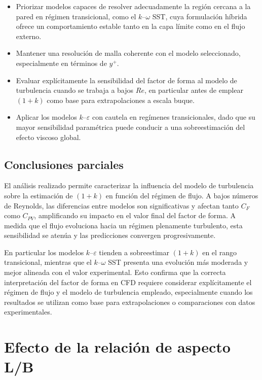 \begin{itemize}
    \item Priorizar modelos capaces de resolver adecuadamente la región cercana a la pared en régimen transicional, como el $k$--$\omega$ SST, 
    cuya formulación híbrida ofrece un comportamiento estable tanto en la capa límite como en el flujo externo.
    \item Mantener una resolución de malla coherente con el modelo seleccionado, especialmente en términos de $y^+$.
    \item Evaluar explícitamente la sensibilidad del factor de forma al modelo de turbulencia cuando se trabaja a bajos $Re$, en particular 
    antes de emplear $(1+k)$ como base para extrapolaciones a escala buque.
    \item Aplicar los modelos $k$--$\varepsilon$ con cautela en regímenes transicionales, dado que su mayor sensibilidad paramétrica puede 
    conducir a una sobreestimación del efecto viscoso global.
\end{itemize}

\subsection{Conclusiones parciales}

El análisis realizado permite caracterizar la influencia del modelo de turbulencia sobre la estimación de $(1+k)$ en función del régimen de flujo.
A bajos números de Reynolds, las diferencias entre modelos son significativas y afectan tanto $C_F$ como $C_{PV}$, amplificando su impacto en el valor
final del factor de forma. A medida que el flujo evoluciona hacia un régimen plenamente turbulento, esta sensibilidad se atenúa y las predicciones
convergen progresivamente.

En particular los modelos $k$--$\varepsilon$ tienden a sobreestimar $(1+k)$ en el rango transicional, mientras que el $k$--$\omega$ SST presenta una
evolución más moderada y mejor alineada con el valor experimental. Esto confirma que la correcta interpretación del factor de forma en CFD requiere
considerar explícitamente el régimen de flujo y el modelo de turbulencia empleado, especialmente cuando los resultados se utilizan como base para
extrapolaciones o comparaciones con datos experimentales.

\section{Efecto de la relación de aspecto L/B}

